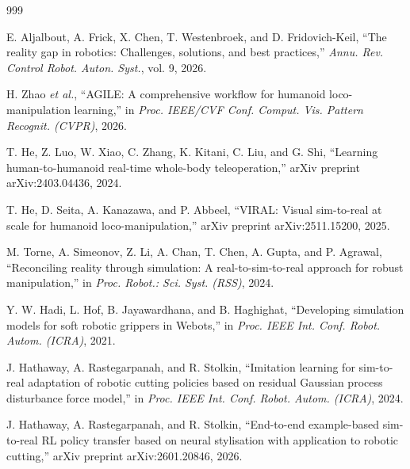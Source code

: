 \documentclass[11pt,a4paper]{article}
\begin{document}
\begin{thebibliography}{999}


E. Aljalbout, A. Frick, X. Chen, T. Westenbroek, and D. Fridovich-Keil, ``The reality gap in robotics: Challenges, solutions, and best practices,'' \textit{Annu. Rev. Control Robot. Auton. Syst.}, vol. 9, 2026.




H. Zhao \textit{et al.}, ``{AGILE}: A comprehensive workflow for humanoid loco-manipulation learning,'' in \textit{Proc. IEEE/CVF Conf. Comput. Vis. Pattern Recognit. (CVPR)}, 2026.




T. He, Z. Luo, W. Xiao, C. Zhang, K. Kitani, C. Liu, and G. Shi, ``Learning human-to-humanoid real-time whole-body teleoperation,'' arXiv preprint arXiv:2403.04436, 2024.




T. He, D. Seita, A. Kanazawa, and P. Abbeel, ``{VIRAL}: Visual sim-to-real at scale for humanoid loco-manipulation,'' arXiv preprint arXiv:2511.15200, 2025.




M. Torne, A. Simeonov, Z. Li, A. Chan, T. Chen, A. Gupta, and P. Agrawal, ``Reconciling reality through simulation: A real-to-sim-to-real approach for robust manipulation,'' in \textit{Proc. Robot.: Sci. Syst. (RSS)}, 2024.




Y. W. Hadi, L. Hof, B. Jayawardhana, and B. Haghighat, ``Developing simulation models for soft robotic grippers in Webots,'' in \textit{Proc. IEEE Int. Conf. Robot. Autom. (ICRA)}, 2021.




J. Hathaway, A. Rastegarpanah, and R. Stolkin, ``Imitation learning for sim-to-real adaptation of robotic cutting policies based on residual Gaussian process disturbance force model,'' in \textit{Proc. IEEE Int. Conf. Robot. Autom. (ICRA)}, 2024.




J. Hathaway, A. Rastegarpanah, and R. Stolkin, ``End-to-end example-based sim-to-real {RL} policy transfer based on neural stylisation with application to robotic cutting,'' arXiv preprint arXiv:2601.20846, 2026.




\end{thebibliography}
\end{document}
